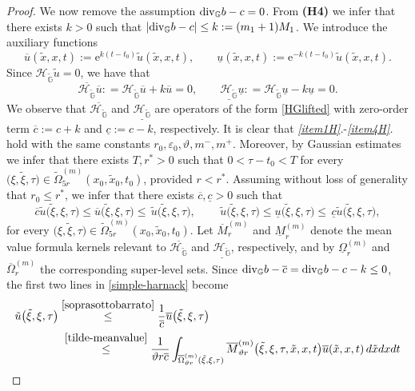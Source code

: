 \documentclass[10pt,a4paper]{amsart}
\def \GG {{\mathbb{G}}}
\def \HG {\mathscr{H}_{\tilde\GG}}
\def \div {{\text{\rm div}}}
\def \e {{\varepsilon}}
\def \t {{\tau}}
\def \tt {\tilde}
\def \x {{\xi}}
\begin{document}
\begin{proof}
	\medskip
	
	We now remove the assumption $\div_{\GG} b-c=0$. From \textbf{(H4)} we infer that there exists $k>0$ such that $|\div_{\GG} b-c|\leq k:=(m_1+1)M_1$. We introduce the auxiliary functions
	\begin{equation}
		\overline u(\tt x,x,t):=\mathrm{e}^{k(t-t_0)}\tt u(\tt x, x,t),\qquad \underline u(\tt x, x,t):=\mathrm{e}^{-k(t-t_0)}\tt u(\tt x,x,t).
	\end{equation}
	Since $\HG \tt u = 0$, we have that
	\begin{equation}
		\overline{\HG} \overline u: = \HG \overline u + k \overline u = 0,\qquad \underline{\HG} \underline u: = \HG \underline u - k \underline u = 0.
	\end{equation}
	We observe that $\overline{\HG}$ and $\underline{\HG}$ are operators of the form \eqref{HGlifted} with zero-order term $\overline{c}:=c+k$ and $\underline{c}:=c-k$, respectively. It is clear that \emph{\ref{item1H}.}-\emph{\ref{item4H}.} hold with the same constants $r_0,\e_0,\vartheta, m^-,m^+$. Moreover, by Gaussian estimates we infer that there exists $T,r^*>0$ such that $0<\t-t_0<T$ for every $\big(\x,\tt \x,\t\big)\in\tt\Omega_{5 r}^{(m)}(x_0,\tt x_0,t_0)$, provided $r<r^*$. Assuming without loss of generality that $r_0 \leq  r^*$, we infer that there exists $\overline{c}, \underline{c}>0$ such that 
	\begin{equation}\label{soprasottobarrato}
		\overline{c}	\tt u\big(\tt \x, \x,\t\big) \leq \overline{u}\big(\tt\x,\x,\t\big) \leq \,\tt u\big(\tt \x,\x,\t\big),\qquad \,\tt u\big(\tt \x, \x,\t\big) \leq \underline{u}\big(\tt \x, \x,\t\big) \leq \,\underline{c}\tt u\big(\tt \x, \x,\t\big),
	\end{equation} 
	for every $\big(\x,\tt \x, \t\big)\in \tt\Omega_{5 r}^{(m)}(x_0,\tt x_0,t_0)$. Let $\overline M_{r}^{(m)}$ and $\underline M_{r}^{(m)}$ denote the mean value formula kernels relevant to $\overline{\HG}$ and $\underline{\HG}$, respectively, and by $\underline\Omega_{r}^{(m)}$ and $\overline\Omega_{r}^{(m)}$ the corresponding super-level sets. Since $\div_{\GG} b - \overline{c}=\div_{\GG} b -c-k \leq 0$, the first two lines in \eqref{simple-harnack} become
	\begin{equation}
		\begin{aligned}
			\tt u\big(\tt \x, \x,\t\big) &\overset{\eqref{soprasottobarrato}}\leq\frac{1}{\overline{c}}\overline{u} \big(\tt \x,\x, \t\big)\\ 
			&\;\overset{\eqref{tilde-meanvalue}}\leq \frac{1}{\vartheta r \overline{c}} \int_{\overline{\Omega}_{\vartheta r}^{(m)}(\tt\x,\x,\t)} \overline{M}_{\vartheta r}^{(m)} \big(\tt\x,\x,\t,\tt x, x,t\big) \overline{u}(\tt x,x,t) \, d\tt x d x dt \\		

\end{aligned}
\end{equation}
\end{proof}
\end{document}
